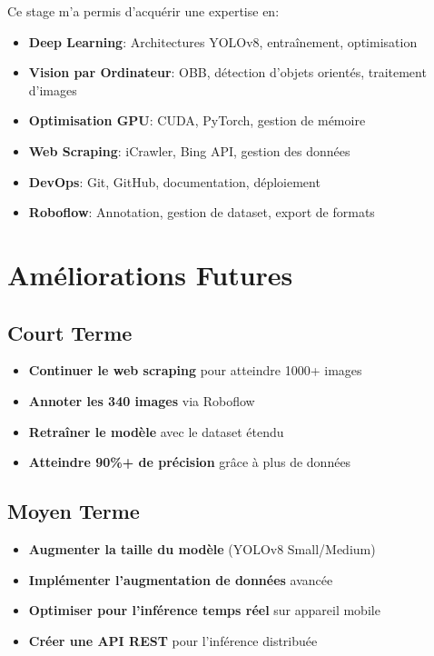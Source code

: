 \documentclass[a4paper,12pt]{report}
\begin{document}
Ce stage m'a permis d'acquérir une expertise en:

\begin{itemize}
    \item \textbf{Deep Learning}: Architectures YOLOv8, entraînement, optimisation
    \item \textbf{Vision par Ordinateur}: OBB, détection d'objets orientés, traitement d'images
    \item \textbf{Optimisation GPU}: CUDA, PyTorch, gestion de mémoire
    \item \textbf{Web Scraping}: iCrawler, Bing API, gestion des données
    \item \textbf{DevOps}: Git, GitHub, documentation, déploiement
    \item \textbf{Roboflow}: Annotation, gestion de dataset, export de formats
\end{itemize}

\section{Améliorations Futures}

\subsection{Court Terme}

\begin{itemize}
    \item \textbf{Continuer le web scraping} pour atteindre 1000+ images
    \item \textbf{Annoter les 340 images} via Roboflow
    \item \textbf{Retraîner le modèle} avec le dataset étendu
    \item \textbf{Atteindre 90\%+ de précision} grâce à plus de données
\end{itemize}

\subsection{Moyen Terme}

\begin{itemize}
    \item \textbf{Augmenter la taille du modèle} (YOLOv8 Small/Medium)
    \item \textbf{Implémenter l'augmentation de données} avancée
    \item \textbf{Optimiser pour l'inférence temps réel} sur appareil mobile
    \item \textbf{Créer une API REST} pour l'inférence distribuée
\end{itemize}
\end{document}
